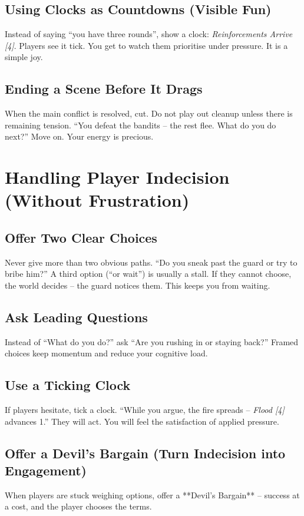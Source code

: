 \subsection*{Using Clocks as Countdowns (Visible Fun)}
Instead of saying “you have three rounds”, show a clock: \textit{Reinforcements Arrive [4]}. Players see it tick. You get to watch them prioritise under pressure. It is a simple joy.

\subsection*{Ending a Scene Before It Drags}
When the main conflict is resolved, cut. Do not play out cleanup unless there is remaining tension. “You defeat the bandits – the rest flee. What do you do next?” Move on. Your energy is precious.

\section{Handling Player Indecision (Without Frustration)}

\subsection*{Offer Two Clear Choices}
Never give more than two obvious paths. “Do you sneak past the guard or try to bribe him?” A third option (“or wait”) is usually a stall. If they cannot choose, the world decides – the guard notices them. This keeps you from waiting.

\subsection*{Ask Leading Questions}
Instead of “What do you do?” ask “Are you rushing in or staying back?” Framed choices keep momentum and reduce your cognitive load.

\subsection*{Use a Ticking Clock}
If players hesitate, tick a clock. “While you argue, the fire spreads – \textit{Flood [4]} advances 1.” They will act. You will feel the satisfaction of applied pressure.

\subsection*{Offer a Devil’s Bargain (Turn Indecision into Engagement)}
\label{subsec:devils-bargain}
When players are stuck weighing options, offer a **Devil’s Bargain** – success at a cost, and the player chooses the terms.

